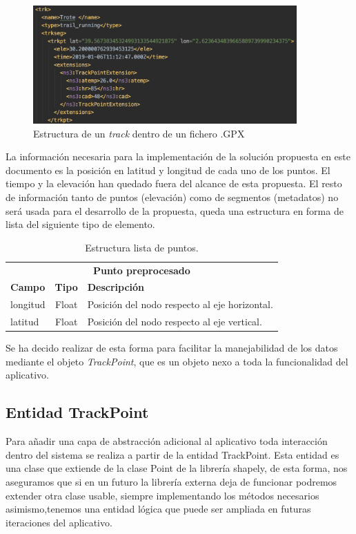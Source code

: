\begin{figure}[htb]
\begin{center}
\includegraphics[width=0.9\textwidth]{./Imagenes/WayPointStructure.png}
\caption{Estructura de un \textit{track} dentro de un fichero .\ac{GPX}}
\label{figure: WayPointStructure}
\end{center}
\end{figure}
\newpage
La información necesaria para la implementación de la solución propuesta en este documento es 
la posición en latitud y longitud de cada uno de los puntos. El tiempo  y la elevación han quedado fuera 
del alcance de esta propuesta. El resto de información tanto de puntos (elevación) como de segmentos 
(metadatos) no será usada para el desarrollo de la propuesta, queda una estructura en forma de lista del 
siguiente tipo 
de elemento.
\begin{table}[h]
\centering
\begin{tabular}{l | c | l} 
\toprule
\multicolumn{3}{c}{\textbf{Punto preprocesado}} \\ 
\cmidrule(r){1-3}
{\textbf{Campo}} &  {\textbf{Tipo}} & {\textbf{Descripción}} \\
\cmidrule(r){1-3}
{longitud}  & Float & Posición del nodo respecto al eje horizontal. \\
{latitud}  & Float & Posición del nodo respecto al eje vertical.\\
\bottomrule
\end{tabular}
\caption{Estructura lista de puntos.}
\label{TablaNodo}
\end{table}
\newpage
Se ha decido realizar de esta forma para facilitar la manejabilidad de los datos mediante el objeto 
\textit{TrackPoint}, que es un objeto nexo a toda la funcionalidad del aplicativo. 

\subsection{Entidad TrackPoint}
Para añadir una capa de abstracción adicional al aplicativo toda interacción dentro del sistema se 
realiza a partir de la entidad TrackPoint. Esta entidad es una clase que extiende de la clase Point 
de la librería shapely, de esta forma, nos aseguramos que si en un futuro la librería externa deja de 
funcionar podremos extender otra clase usable, siempre implementando los métodos necesarios 
asimismo,tenemos una entidad lógica que puede ser ampliada en futuras iteraciones del 
aplicativo.

